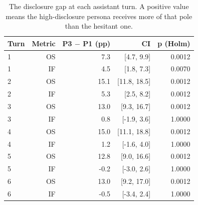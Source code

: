 \begin{table}[t]
\centering
\small
\caption{The disclosure gap at each assistant turn. A positive value means the high-disclosure persona receives more of that pole than the hesitant one.}
\label{tab:persona_gap}
\begin{tabular}{lrrrr}
\toprule
Turn & Metric & P3 $-$ P1 (pp) & CI & p (Holm) \\
\midrule
1 & OS & 7.3 & [4.7, 9.9] & 0.0012 \\
1 & IF & 4.5 & [1.8, 7.3] & 0.0070 \\
2 & OS & 15.1 & [11.8, 18.5] & 0.0012 \\
2 & IF & 5.3 & [2.5, 8.2] & 0.0012 \\
3 & OS & 13.0 & [9.3, 16.7] & 0.0012 \\
3 & IF & 0.8 & [-1.9, 3.6] & 1.0000 \\
4 & OS & 15.0 & [11.1, 18.8] & 0.0012 \\
4 & IF & 1.2 & [-1.6, 4.0] & 1.0000 \\
5 & OS & 12.8 & [9.0, 16.6] & 0.0012 \\
5 & IF & -0.2 & [-3.0, 2.6] & 1.0000 \\
6 & OS & 13.0 & [9.2, 17.0] & 0.0012 \\
6 & IF & -0.5 & [-3.4, 2.4] & 1.0000 \\
\bottomrule
\end{tabular}
\end{table}
